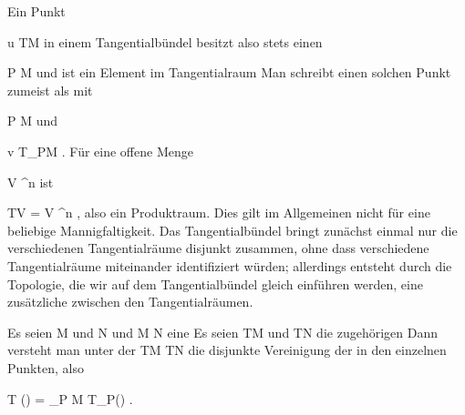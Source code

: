 Ein Punkt

\mavergleichskette
{\vergleichskette
{ u
}
{ \in }{ TM
}
{  }{
}
{    }{
}
{   }{
}
}
{}{}{}
in einem Tangentialbündel besitzt also stets einen  {}

\mavergleichskette
{\vergleichskette
{ P
}
{ \in }{ M
}
{  }{
}
{    }{
}
{   }{
}
}
{}{}{}
und ist ein Element im Tangentialraum
 Man schreibt einen solchen Punkt zumeist als
 mit

\mavergleichskette
{\vergleichskette
{ P
}
{ \in }{ M
}
{  }{
}
{    }{
}
{   }{
}
}
{}{}{}
und

\mavergleichskette
{\vergleichskette
{ v
}
{ \in }{ T_PM
}
{  }{
}
{    }{
}
{   }{
}
}
{}{}{.}
Für eine offene Menge

\mavergleichskette
{\vergleichskette
{ V
}
{ \subseteq }{ \R^n
}
{  }{
}
{    }{
}
{   }{
}
}
{}{}{}
ist

\mavergleichskette
{\vergleichskette
{ TV
}
{ = }{ V \times \R^n
}
{  }{
}
{    }{
}
{   }{
}
}
{}{}{,}
also ein Produktraum. Dies gilt im Allgemeinen nicht für eine beliebige Mannigfaltigkeit. Das Tangentialbündel bringt zunächst einmal nur die verschiedenen Tangentialräume disjunkt zusammen, ohne dass verschiedene Tangentialräume miteinander identifiziert würden; allerdings entsteht durch die Topologie, die wir auf dem Tangentialbündel gleich einführen werden, eine zusätzliche  zwischen den Tangentialräumen.


{}
{





Es seien
\mathkor {} {M} {und} {N} {}
und
\maabbdisp {\varphi} { M } { N
} {}
eine
Es seien
\mathkor {} {TM} {und} {TN} {}
die zugehörigen
Dann versteht man unter der 
 {TM} {TN
} {}
die disjunkte Vereinigung der
in den einzelnen Punkten, also

\mavergleichskettedisp
{\vergleichskette
{ T (\varphi)
}
{ =} { \biguplus_{P \in M} T_P(\varphi)
}
{ } {
}
{ } {
}
{ } {
}
}
{}{}{.}





}

